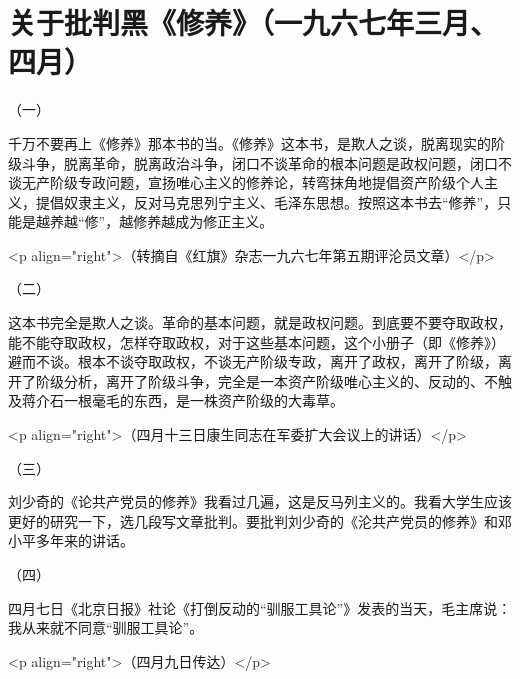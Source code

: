 \section[关于批判黑《修养》（一九六七年三月、四月）]{关于批判黑《修养》（一九六七年三月、四月）}


（一）

千万不要再上《修养》那本书的当。《修养》这本书，是欺人之谈，脱离现实的阶级斗争，脱离革命，脱离政治斗争，闭口不谈革命的根本问题是政权问题，闭口不谈无产阶级专政问题，宣扬唯心主义的修养论，转弯抹角地提倡资产阶级个人主义，提倡奴隶主义，反对马克思列宁主义、毛泽东思想。按照这本书去“修养”，只能是越养越“修”，越修养越成为修正主义。

<p align="right">（转摘自《红旗》杂志一九六七年第五期评沦员文章）</p>

（二）

这本书完全是欺人之谈。革命的基本问题，就是政权问题。到底要不要夺取政权，能不能夺取政权，怎样夺取政权，对于这些基本问题，这个小册子（即《修养》）避而不谈。根本不谈夺取政权，不谈无产阶级专政，离开了政权，离开了阶级，离开了阶级分析，离开了阶级斗争，完全是一本资产阶级唯心主义的、反动的、不触及蒋介石一根毫毛的东西，是一株资产阶级的大毒草。

<p align="right">（四月十三日康生同志在军委扩大会议上的讲话）</p>

（三）

刘少奇的《论共产党员的修养》我看过几遍，这是反马列主义的。我看大学生应该更好的研究一下，选几段写文章批判。要批判刘少奇的《沦共产党员的修养》和邓小平多年来的讲话。

（四）

四月七日《北京日报》社论《打倒反动的“驯服工具论”》发表的当天，毛主席说：我从来就不同意“驯服工具论”。

<p align="right">（四月九日传达）</p>



